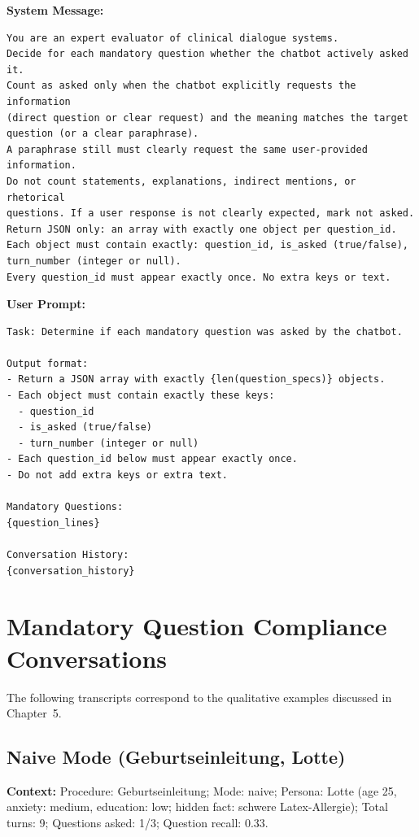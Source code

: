 \textbf{System Message:}
\begin{Verbatim}[fontsize=\small,breaklines=true,breakanywhere=true]
You are an expert evaluator of clinical dialogue systems.
Decide for each mandatory question whether the chatbot actively asked it.
Count as asked only when the chatbot explicitly requests the information 
(direct question or clear request) and the meaning matches the target 
question (or a clear paraphrase).
A paraphrase still must clearly request the same user-provided information.
Do not count statements, explanations, indirect mentions, or rhetorical 
questions. If a user response is not clearly expected, mark not asked.
Return JSON only: an array with exactly one object per question_id.
Each object must contain exactly: question_id, is_asked (true/false), 
turn_number (integer or null).
Every question_id must appear exactly once. No extra keys or text.
\end{Verbatim}

\textbf{User Prompt:}
\begin{Verbatim}[fontsize=\small,breaklines=true,breakanywhere=true]
Task: Determine if each mandatory question was asked by the chatbot.

Output format:
- Return a JSON array with exactly {len(question_specs)} objects.
- Each object must contain exactly these keys:
  - question_id
  - is_asked (true/false)
  - turn_number (integer or null)
- Each question_id below must appear exactly once.
- Do not add extra keys or extra text.

Mandatory Questions:
{question_lines}

Conversation History:
{conversation_history}
\end{Verbatim}

\chapter{Mandatory Question Compliance Conversations}
\label{app:mandatory_q_excerpts}

The following transcripts correspond to the qualitative examples discussed in Chapter~5.

\section{Naive Mode (Geburtseinleitung, Lotte)}
\textbf{Context:} Procedure: Geburtseinleitung; Mode: naive; Persona: Lotte (age 25, anxiety: medium, education: low; hidden fact: schwere Latex-Allergie); Total turns: 9; Questions asked: 1/3; Question recall: 0.33.

